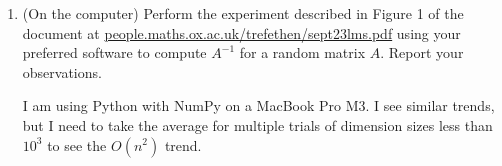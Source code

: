 \documentclass[12pt]{article}
\begin{document}
\begin{enumerate}
    \item (On the computer) Perform the experiment described in Figure 1 of the document at \url{people.maths.ox.ac.uk/trefethen/sept23lms.pdf} using your preferred software to compute \(A^{-1}\) for a random matrix \(A\). Report your observations.
    
    I am using Python with NumPy on a MacBook Pro M3. I see similar trends, but I need to take the average for multiple trials of dimension sizes less than $10^3$ to see the $O(n^2)$ trend.

    



    
\end{enumerate}
\end{document}
